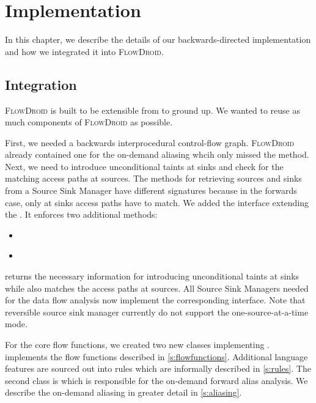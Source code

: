 \documentclass[../draft.tex]{subfiles}
\begin{document}
    \chapter{Implementation}
    In this chapter, we describe the details of our backwards-directed implementation and how we integrated it into \textsc{FlowDroid}.

    \section{Integration}
    \textsc{FlowDroid} is built to be extensible from to ground up. We wanted to reuse as much components of \textsc{FlowDroid} as possible. 
    
    First, we needed a backwards interprocedural control-flow graph. \textsc{FlowDroid} already contained one for the on-demand aliasing whcih only missed the  method.
    Next, we need to introduce unconditional taints at sinks and check for the matching access paths at sources.
    The methods for retrieving sources and sinks from a Source Sink Manager have different signatures because in the forwards case, only at sinks access paths have to match. We added the interface  extending the . It enforces two additional methods:
    \begin{itemize}
        \item {}\\
        \item {}\\
    \end{itemize}
     returns the necessary information for introducing unconditional taints at sinks while  also matches the access paths at sources.
    All Source Sink Managers needed for the data flow analysis now implement the corresponding interface.
    Note that reversible source sink manager currently do not support the one-source-at-a-time mode.

    For the core flow functions, we created two new classes implementing .  implements the flow functions described in \autoref{s:flowfunctions}. Additional language features are sourced out into rules which are informally described in \autoref{s:rules}. The second class is  which is responsible for the on-demand forward alias analysis. We describe the on-demand aliasing in greater detail in \autoref{s:aliasing}.
\end{document}
